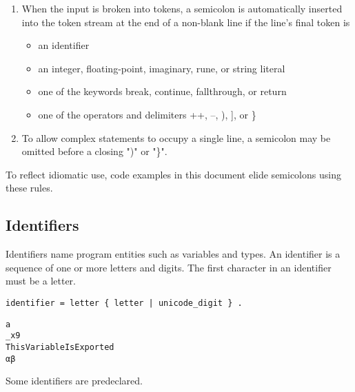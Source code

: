\documentclass[UTF8]{article}
\begin{document}
\begin{enumerate}

  \item When the input is broken into tokens, a semicolon is
  automatically inserted into the token stream at the end of a
  non-blank line if the line's final token is

  \begin{itemize}

    \item an identifier

    \item an integer, floating-point, imaginary, rune, or string
    literal

    \item one of the keywords break, continue, fallthrough, or
    return

    \item one of the operators and delimiters ++, --, ), ], or \}
  \end{itemize}

  \item To allow complex statements to occupy a single line, a
  semicolon may be omitted before a closing ")" or "\}".

\end{enumerate}

To reflect idiomatic use, code examples in this document elide
semicolons using these rules.

\subsection*{Identifiers}
Identifiers name program entities such as variables and types. An
identifier is a sequence of one or more letters and digits. The
first character in an identifier must be a letter.

\begin{Verbatim}[frame=single]
identifier = letter { letter | unicode_digit } .
\end{Verbatim}

\begin{Verbatim}[frame=single]
a
_x9
ThisVariableIsExported
αβ
\end{Verbatim}

Some identifiers are predeclared.
\end{document}
